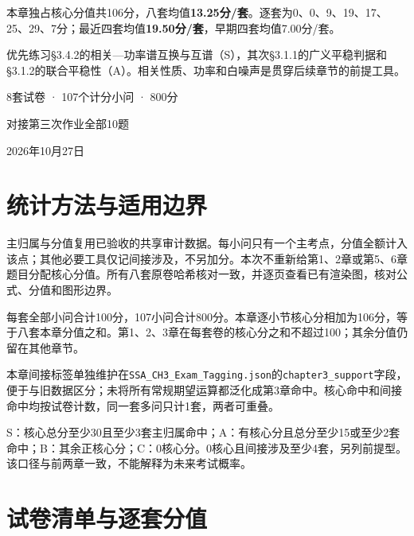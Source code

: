 \documentclass[11pt,fontset=fandol]{ctexart}
\begin{document}
\begin{titlepage}\centering\vspace*{1.5cm}{\Huge\bfseries 随机信号分析}\par\vspace{1cm}{\LARGE\bfseries 第3章考频分析报告}\par\vspace{6mm}{\large 平稳性与功率谱密度 · 八套真题版}\par\vspace{1cm}

\begin{keybox}[title=本样本的结论]本章独占核心分值共106分，八套均值\textbf{13.25分/套}。逐套为0、0、9、19、17、25、29、7分；最近四套均值\textbf{19.50分/套}，早期四套均值7.00分/套。\par 优先练习§3.4.2的相关—功率谱互换与互谱（S），其次§3.1.1的广义平稳判据和§3.1.2的联合平稳性（A）。相关性质、功率和白噪声是贯穿后续章节的前提工具。\end{keybox}

\vfill 8套试卷 · 107个计分小问 · 800分\par 对接第三次作业全部10题\par 2026年10月27日\end{titlepage}

\tableofcontents\clearpage

\section{统计方法与适用边界}

主归属与分值复用已验收的共享审计数据。每小问只有一个主考点，分值全额计入该点；其他必要工具仅记间接涉及，不另加分。本次不重新给第1、2章或第5、6章题目分配核心分值。所有八套原卷哈希核对一致，并逐页查看已有渲染图，核对公式、分值和图形边界。

每套全部小问合计100分，107小问合计800分。本章逐小节核心分相加为106分，等于八套本章分值之和。第1、2、3章在每套卷的核心分之和不超过100；其余分值仍留在其他章节。

本章间接标签单独维护在\texttt{SSA\_CH3\_Exam\_Tagging.json}的\texttt{chapter3\_support}字段，便于与旧数据区分；未将所有常规期望运算都泛化成第3章命中。核心命中和间接命中均按试卷计数，同一套多问只计1套，两者可重叠。

S：核心总分至少30且至少3套主归属命中；A：有核心分且总分至少15或至少2套命中；B：其余正核心分；C：0核心分。0核心且间接涉及至少4套，另列前提型。该口径与前两章一致，不能解释为未来考试概率。

\section{试卷清单与逐套分值}
\end{document}
